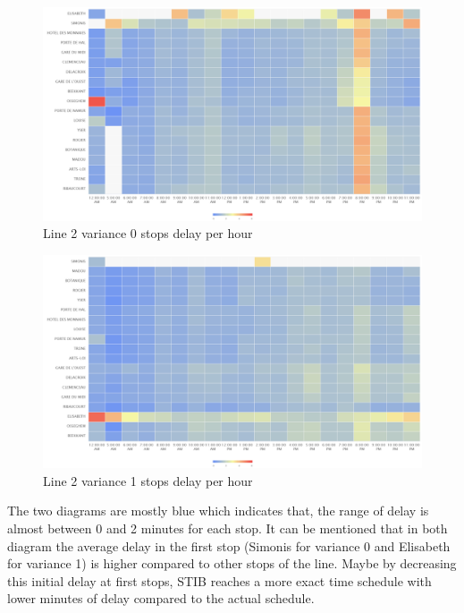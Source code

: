\documentclass{article}
\begin{document}
 \begin{figure}[H]
    \centering
    \includegraphics[width=\textwidth]{images/delay_2_stop_hour_0.png} 
    \caption{Line 2 variance 0 stops delay per hour}%
\end{figure}
 \begin{figure}[H]
    \centering
    \includegraphics[width=\textwidth]{images/delay_2_stop_hour_1.png} 
    \caption{Line 2 variance 1 stops delay per hour}
\end{figure}

The two diagrams are mostly blue which indicates that, the range of delay is almost between 0 and 2 minutes for each stop. It can be mentioned that in both diagram the average delay in the first stop (Simonis for variance 0 and Elisabeth for variance 1) is higher compared to other stops of the line. Maybe by decreasing this initial delay at first stops, STIB reaches a more exact time schedule with lower minutes of delay compared to the actual schedule.
\end{document}
